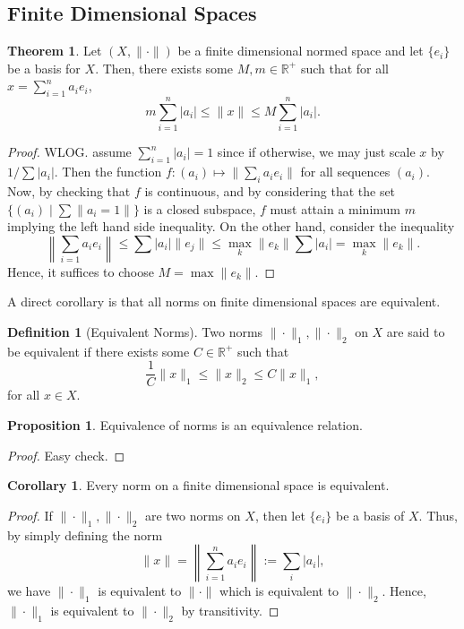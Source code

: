 \documentclass[]{article}
\theoremstyle{definition}
\newtheorem{theorem}{Theorem}
\theoremstyle{definition}
\newtheorem{definition}{Definition}[section]
\newtheorem{proposition}{Proposition}[section]
\newtheorem{corollary}{Corollary}[section]
\begin{document}
\subsection{Finite Dimensional Spaces}

\begin{theorem}
  Let \((X, \|\cdot\|)\) be a finite dimensional normed space and let 
  \(\{e_i\}\) be a basis for \(X\). Then, there exists some 
  \(M, m \in \mathbb{R}^+\) such that for all \(x = \sum_{i = 1}^n a_i e_i\),
  \[m \sum_{i = 1}^n |a_i| \le \|x\| \le M \sum_{i = 1}^n|a_i|.\]
\end{theorem}
\begin{proof}
  WLOG. assume \(\sum_{i = 1}^n |a_i| = 1\) since if otherwise, we may just scale 
  \(x\) by \(1 / \sum |a_i|\). Then the function 
  \(f : (a_i) \mapsto \|\sum_i a_i e_i\|\) for all sequences \((a_i)\). Now, 
  by checking that \(f\) is continuous, and by considering that the set 
  \(\{(a_i) \mid \sum \|a_i = 1\|\}\) is a closed subspace, \(f\) must 
  attain a minimum \(m\) implying the left hand side inequality. 
  On the other hand, consider the inequality 
  \[\left\| \sum_{i = 1} a_i e_i \right\| \le \sum |a_i| \|e_j\| \le 
    \max_k \|e_k\| \sum |a_i| = \max_k \|e_k\|.\]
  Hence, it suffices to choose \(M = \max \|e_k\|\).
\end{proof}

A direct corollary is that all norms on finite dimensional spaces are equivalent.

\begin{definition}[Equivalent Norms]
  Two norms \(\|\cdot\|_1, \|\cdot\|_2\) on \(X\) are said to be equivalent 
  if there exists some \(C \in \mathbb{R}^+\) such that 
  \[\frac{1}{C}\|x\|_1 \le \|x\|_2 \le C\|x\|_1,\]
  for all \(x \in X\).
\end{definition}

\begin{proposition}
  Equivalence of norms is an equivalence relation.
\end{proposition}
\begin{proof}
  Easy check.
\end{proof}

\begin{corollary}
  Every norm on a finite dimensional space is equivalent.
\end{corollary}
\begin{proof}
  If \(\|\cdot\|_1, \|\cdot\|_2\) are two norms on \(X\), then
  let \(\{e_i\}\) be a basis of \(X\). Thus, by simply defining the norm 
  \[\|x\| = \left\| \sum_{i = 1}^n a_i e_i \right\| := 
    \sum_i |a_i|,\]
  we have \(\|\cdot\|_1\) is equivalent to \(\|\cdot\|\) which is equivalent 
  to \(\|\cdot\|_2\). Hence, \(\|\cdot\|_1\) is equivalent to \(\|\cdot\|_2\) 
  by transitivity.
\end{proof}
\end{document}
